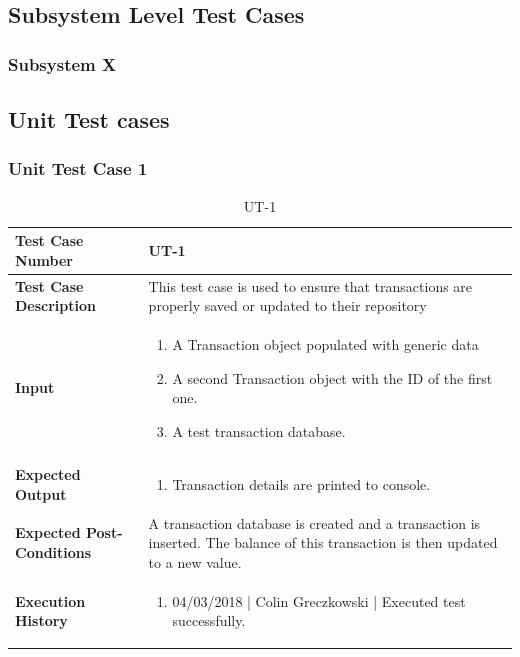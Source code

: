 \documentclass[12pt]{article}
\begin{document}
\subsection{Subsystem Level Test Cases}

\subsubsection{Subsystem X}
\clearpage
\subsection{Unit Test cases}

\subsubsection{Unit Test Case 1}
\def\arraystretch{1.5}%
\begin{table}[htbp]
\centering
\caption {UT-1}
\label{UT-1}
\begin{tabularx}{\textwidth}{ | l | X |}
\hline
\textbf{Test Case Number}      &  UT-1                         \\ \hline
\textbf{Test Case Description}    &  This test case is used to ensure that transactions are properly saved or updated to their repository                \\ \hline
\textbf{Input}         & 	\begin{enumerate}
	\item A Transaction object populated with generic data
          \item A second Transaction object with the ID of the first one.
	\item A test transaction database.
\end{enumerate} \\ \hline

\textbf{Expected Output}     & \begin{enumerate}
	\item Transaction details are printed to console.
\end{enumerate} \\ \hline
\textbf{Expected Post-Conditions}           &  A transaction database is created and a transaction is inserted. The balance of this transaction is then updated to a new value.                   \\ \hline
\textbf{Execution History}   &  \begin{enumerate}
	\item 04/03/2018 | Colin Greczkowski | Executed test successfully.
\end {enumerate} \\ \hline
\end{tabularx}
\end{table}
\clearpage
\end{document}
